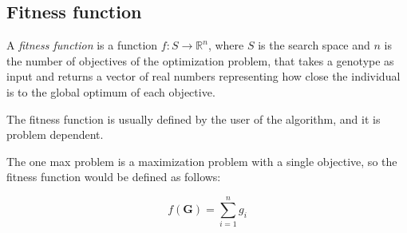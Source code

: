 \subsection{Fitness function}
\label{ssec:genetic_algorithm:fitness_function}
  \begin{definition}
  \label{def:fitness_function}
    A \emph{fitness function} is a function \(f: S \rightarrow \mathbb{R}^n\), where \(S\) is the
    search space and \(n\) is the number of objectives of the optimization problem, that takes a
    genotype as input and returns a vector of real numbers representing how close the individual 
    is to the global optimum of each objective.

    The fitness function is usually defined by the user of the algorithm, and it is problem
    dependent.
  \end{definition}

  The one max problem is a maximization problem with a single objective, so the fitness function
  would be defined as follows:

  \begin{equation}
    \label{eq:fitness_function:one_max}
    f(\mathbf{G}) = \sum_{i=1}^n g_i
  \end{equation}
